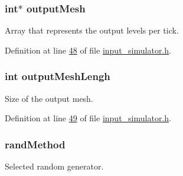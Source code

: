 \hypertarget{structinput_simulator_state_a666eb9ad96121cf3e4ce134e1a4c12c0}{}
\subsubsection[{output\+Mesh}]{\setlength{\rightskip}{0pt plus 5cm}int$\ast$ output\+Mesh}\label{structinput_simulator_state_a666eb9ad96121cf3e4ce134e1a4c12c0}


Array that represents the output levels per tick. 



Definition at line \hyperlink{input__simulator_8h_source_l00048}{48} of file \hyperlink{input__simulator_8h_source}{input\+\_\+simulator.\+h}.

\hypertarget{structinput_simulator_state_a97727a3be0dbd5813f860c99733048a8}{}
\subsubsection[{output\+Mesh\+Lengh}]{\setlength{\rightskip}{0pt plus 5cm}int output\+Mesh\+Lengh}\label{structinput_simulator_state_a97727a3be0dbd5813f860c99733048a8}


Size of the output mesh. 



Definition at line \hyperlink{input__simulator_8h_source_l00049}{49} of file \hyperlink{input__simulator_8h_source}{input\+\_\+simulator.\+h}.

\hypertarget{structinput_simulator_state_a18766f12fc4212349fb61b221f83b779}{}
\subsubsection[{rand\+Method}]{ rand\+Method}\label{structinput_simulator_state_a18766f12fc4212349fb61b221f83b779}


Selected random generator. 



